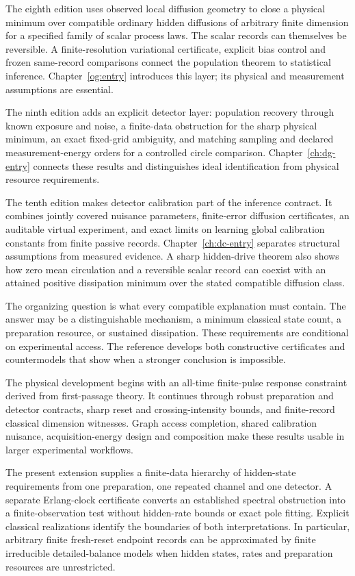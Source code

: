 \documentclass[11pt,oneside]{book}
\theoremstyle{definition}
\theoremstyle{remark}
\begin{document}
The eighth edition uses observed local diffusion geometry to close a physical
minimum over compatible ordinary hidden diffusions of arbitrary finite
dimension for a specified family of scalar process laws. The scalar records
can themselves be reversible. A finite-resolution variational certificate,
explicit bias control and frozen same-record comparisons connect the population
theorem to statistical inference. Chapter~\ref{og:entry} introduces this layer;
its physical and measurement assumptions are essential.


The ninth edition adds an explicit detector layer: population recovery through
known exposure and noise, a finite-data obstruction for the sharp physical
minimum, an exact fixed-grid ambiguity, and matching sampling and declared
measurement-energy orders for a controlled circle comparison.
Chapter~\ref{ch:dg-entry} connects these results and distinguishes ideal
identification from physical resource requirements.


The tenth edition makes detector calibration part of the inference contract.
It combines jointly covered nuisance parameters, finite-error diffusion
certificates, an auditable virtual experiment, and exact limits on learning
global calibration constants from finite passive records.
Chapter~\ref{ch:dc-entry} separates structural assumptions from measured evidence.
A sharp hidden-drive theorem also shows how zero mean circulation and a
reversible scalar record can coexist with an attained positive dissipation
minimum over the stated compatible diffusion class.

The organizing question is what every compatible explanation must contain.
The answer may be a distinguishable mechanism, a minimum classical state count,
a preparation resource, or sustained dissipation. These requirements are
conditional on experimental access. The reference develops both constructive
certificates and countermodels that show when a stronger conclusion is impossible.

The physical development begins with an all-time finite-pulse response
constraint derived from first-passage theory. It continues through robust
preparation and detector contracts, sharp reset and crossing-intensity bounds,
and finite-record classical dimension witnesses. Graph access completion,
shared calibration nuisance, acquisition-energy design and composition make
these results usable in larger experimental workflows.

The present extension supplies a finite-data hierarchy of hidden-state
requirements from one preparation, one repeated channel and one detector.
A separate Erlang-clock certificate converts an established spectral
obstruction into a finite-observation test without hidden-rate bounds or exact
pole fitting. Explicit classical realizations identify the boundaries of both
interpretations. In particular, arbitrary finite fresh-reset endpoint records
can be approximated by finite irreducible detailed-balance models when hidden
states, rates and preparation resources are unrestricted.
\end{document}
